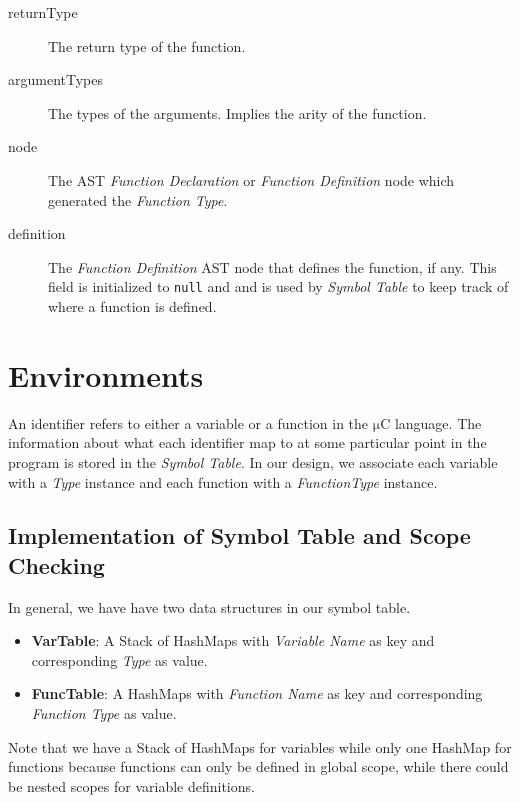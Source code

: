 \documentclass[a4paper,11pt]{article}
\newcommand{\uC}{{$\mathrm{\mu}$}C }
\begin{document}
\begin{description}
\item[returnType] The return type of the function.
\item[argumentTypes] The types of the arguments. Implies the arity of the
  function.
\item[node] The AST \emph{Function Declaration} or \emph{Function Definition} node which generated the \emph{Function Type}.
\item[definition] The \emph{Function Definition} AST node that defines the function, if any.
  This field is initialized to \texttt{null} and and is used by \emph{Symbol Table} to keep track of where a function is defined.
\end{description}

\section{Environments}
An identifier refers to either a variable or a function in the \uC language. The
information about what each identifier map to at some particular point in the
program is stored in the \emph{Symbol Table}. In our design, we associate each
variable with a \emph{Type} instance and each function with a
\emph{FunctionType} instance.

\subsection{Implementation of Symbol Table and Scope Checking}
In general, we have have two data structures in our symbol table.
\begin{itemize}
\item \textbf{VarTable}: A Stack of HashMaps with \emph{Variable Name} as key
  and corresponding \emph{Type} as value.
\item \textbf{FuncTable}: A HashMaps with \emph{Function Name} as key and
  corresponding \emph{Function Type} as value.
\end{itemize}

Note that we have a Stack of HashMaps for variables while only one HashMap for
functions because functions can only be defined in global scope, while there
could be nested scopes for variable definitions.
\end{document}
